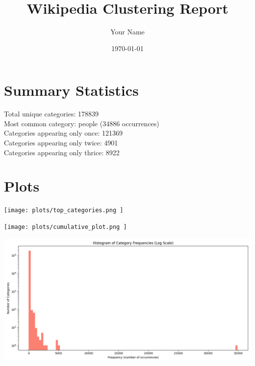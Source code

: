 \documentclass{article}
\title{Wikipedia Clustering Report}
\author{Your Name}
\date{\today}
\begin{document}
\maketitle

\section{Summary Statistics}

Total unique categories: 178839 \\
Most common category: \textttLiving people (34886 occurrences) \\
Categories appearing only once: 121369 \\
Categories appearing only twice: 4901 \\
Categories appearing only thrice: 8922 \\

\section{Plots}

\texttt{[image:  plots/top\_categories.png ]}

\texttt{[image:  plots/cumulative\_plot.png ]}

\includegraphics[width=\linewidth]{ plots/histogram_plot.png }
\end{document}
